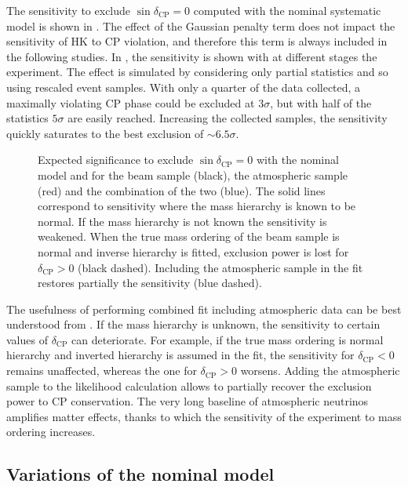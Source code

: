 The sensitivity to exclude $\sin\delta_\text{CP} = 0$ computed with the nominal systematic model %
is shown in .
The effect of the Gaussian penalty term does not impact the sensitivity of HK to CP violation, and %
therefore this term is always included in the following studies.
In , the sensitivity is shown with at different stages the experiment.
The effect is simulated by considering only partial statistics and so using rescaled event samples.
With only a quarter of the data collected, a maximally violating CP phase could be excluded at $3\sigma$, %
but with half of the statistics $5\sigma$ are easily reached.
Increasing the collected samples, the sensitivity quickly saturates to the best exclusion of $\sim6.5\sigma$.

\begin{figure}
	\centering
	\resizebox{0.7\linewidth}{!}{}
	\caption[Sensitivity to $\delta_\text{CP}$ with the nominal model and unknown hierarchy]%
		{Expected significance to exclude $\sin\delta_\text{CP} = 0$ with the nominal model and %
		for the beam sample (black), the atmospheric sample (red) and the combination of the two (blue).
		The solid lines correspond to sensitivity where the mass hierarchy is known to be normal.
		If the mass hierarchy is not known the sensitivity is weakened.
		When the true mass ordering of the beam sample is normal and inverse hierarchy is fitted, %
		exclusion power is lost for $\delta_\text{CP} > 0$ (black dashed).
		Including the atmospheric sample in the fit restores partially the sensitivity (blue dashed).}
	\label{fig:combined_sens}
\end{figure}

The usefulness of performing combined fit including atmospheric data can be best understood from .
If the mass hierarchy is unknown, the sensitivity to certain values of $\delta_\text{CP}$ can deteriorate.
For example, if the true mass ordering is normal hierarchy and inverted hierarchy is assumed in the fit, %
the sensitivity for $\delta_\text{CP} < 0$ remains unaffected, whereas the one for $\delta_\text{CP} > 0$ worsens.
Adding the atmospheric sample to the likelihood calculation allows to partially recover the exclusion power to CP conservation.
The very long baseline of atmospheric neutrinos amplifies matter effects, thanks to which the sensitivity %
of the experiment to mass ordering increases.


\subsection{Variations of the nominal model}
\label{sec:variations}


